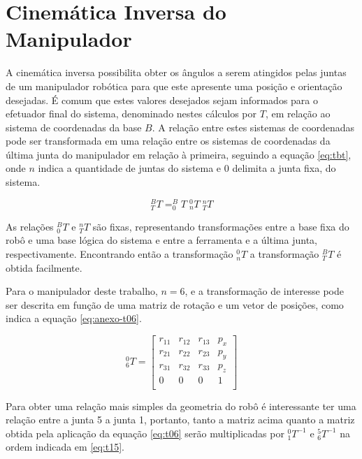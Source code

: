 \chapter{Cinemática Inversa do Manipulador}
\label{Anexo-CinInv}

A cinemática inversa possibilita obter os ângulos a serem atingidos pelas juntas de um
manipulador robótica para que este apresente uma posição e orientação desejadas. É comum
que estes valores desejados sejam informados para o efetuador final do sistema, denominado nestes 
cálculos por $T$, em relação ao sistema de coordenadas da base $B$.
A relação entre estes sistemas de coordenadas pode ser transformada em uma relação 
entre os sistemas de coordenadas da última junta do manipulador em relação à primeira, seguindo a equação 
\ref{eq:tbt}, onde $n$ indica a quantidade de juntas do sistema e $0$ delimita a junta fixa, do sistema.

\begin{equation}
    \label{eq:tbt}
    ^B_TT = ^B_0\!T\;^0_nT\;^n_TT
\end{equation}

As relações $^B_0\!T$ e $^n_TT$ são fixas, representando transformações entre a base fixa do 
robô e uma base lógica do sistema e entre a ferramenta e a última junta, respectivamente. 
Encontrando então a transformação $^0_nT$ a transformação $^B_TT$ é obtida facilmente. 

Para o manipulador deste trabalho, $n=6$, e a transformação de interesse pode ser descrita em 
função de uma matriz de rotação e um vetor de posições, como indica a equação \ref{eq:anexo-t06}.

\begin{equation}
    \label{eq:anexo-t06}
    ^0_6T = 
    \begin{bmatrix}
        r_{11} & r_{12} & r_{13} & p_x \\
        r_{21} & r_{22} & r_{23} & p_y \\
        r_{31} & r_{32} & r_{33} & p_z \\
           0   &    0   &    0   &  1  \\    
    \end{bmatrix}
\end{equation}

Para obter uma relação mais simples da geometria do robô é interessante ter uma relação 
entre a junta 5 a junta 1, portanto, tanto a matriz acima quanto a matriz obtida pela aplicação da
equação \ref{eq:t06} serão multiplicadas por $^0_1T^{-1}$ e $^5_6T^{-1}$ na ordem indicada em \ref{eq:t15}.

